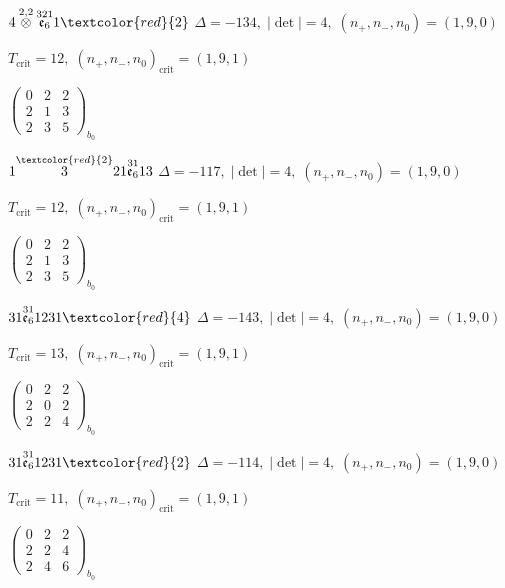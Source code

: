 \documentclass[10pt]{article}
\begin{document}
\smallskip

$4\overset{2,2}{\otimes}\overset{321}{\mathfrak{e}_6}1\textcolor{red}{2}$ \quad $\Delta=-134,\; |\det|=4,\; (n_+,n_-,n_0)=(1,9,0)$

\hspace{1em}$T_{\text{crit}}=12,\; (n_+,n_-,n_0)_{\text{crit}}=(1,9,1)$

\hspace{2em}$\left(\begin{smallmatrix}0 & 2 & 2 \\ 2 & 1 & 3 \\ 2 & 3 & 5\end{smallmatrix}\right)_{\!b_0}$

\smallskip

$1\overset{\textcolor{red}{2}}{3}21\overset{31}{\mathfrak{e}_6}13$ \quad $\Delta=-117,\; |\det|=4,\; (n_+,n_-,n_0)=(1,9,0)$

\hspace{1em}$T_{\text{crit}}=12,\; (n_+,n_-,n_0)_{\text{crit}}=(1,9,1)$

\hspace{2em}$\left(\begin{smallmatrix}0 & 2 & 2 \\ 2 & 1 & 3 \\ 2 & 3 & 5\end{smallmatrix}\right)_{\!b_0}$

$31\overset{31}{\mathfrak{e}_6}1231\textcolor{red}{4}$ \quad $\Delta=-143,\; |\det|=4,\; (n_+,n_-,n_0)=(1,9,0)$

\hspace{1em}$T_{\text{crit}}=13,\; (n_+,n_-,n_0)_{\text{crit}}=(1,9,1)$

\hspace{2em}$\left(\begin{smallmatrix}0 & 2 & 2 \\ 2 & 0 & 2 \\ 2 & 2 & 4\end{smallmatrix}\right)_{\!b_0}$

$31\overset{31}{\mathfrak{e}_6}1231\textcolor{red}{2}$ \quad $\Delta=-114,\; |\det|=4,\; (n_+,n_-,n_0)=(1,9,0)$

\hspace{1em}$T_{\text{crit}}=11,\; (n_+,n_-,n_0)_{\text{crit}}=(1,9,1)$

\hspace{2em}$\left(\begin{smallmatrix}0 & 2 & 2 \\ 2 & 2 & 4 \\ 2 & 4 & 6\end{smallmatrix}\right)_{\!b_0}$
\end{document}
